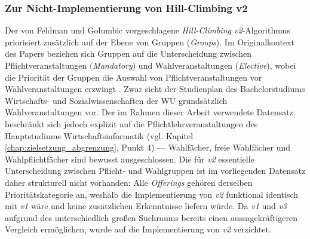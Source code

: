 \subsubsection{Zur Nicht-Implementierung von Hill-Climbing v2}

Der von Feldman und Golumbic vorgeschlagene \textit{Hill-Climbing v2}-Algorithmus priorisiert zusätzlich auf der Ebene von Gruppen (\textit{Groups}). Im Originalkontext des Papers beziehen sich Gruppen auf die Unterscheidung zwischen Pflichtveranstaltungen (\textit{Mandatory}) und Wahlveranstaltungen (\textit{Elective}), wobei die Priorität der Gruppen die Auswahl von Pflichtveranstaltungen vor Wahlveranstaltungen erzwingt \cite{feldmangolumbic}.
Zwar sieht der Studienplan des Bachelorstudiums Wirtschafts- und Sozialwissenschaften der WU grundsätzlich Wahlveranstaltungen vor. Der im Rahmen dieser Arbeit verwendete Datensatz beschränkt sich jedoch explizit auf die Pflichtlehrveranstaltungen des Hauptstudiums Wirtschaftsinformatik (vgl. Kapitel \ref{chap:zielsetzung_abgrenzung}, Punkt 4) --- Wahlfächer, freie Wahlfächer und Wahlpflichtfächer sind bewusst ausgeschlossen. Die für \textit{v2} essentielle Unterscheidung zwischen Pflicht- und Wahlgruppen ist im vorliegenden Datensatz daher strukturell nicht vorhanden: Alle \textit{Offerings} gehören derselben Prioritätskategorie an, weshalb die Implementierung von \textit{v2} funktional identisch mit \textit{v1} wäre und keine zusätzlichen Erkenntnisse liefern würde. Da \textit{v1} und \textit{v3} aufgrund des unterschiedlich großen Suchraums bereits einen aussagekräftigeren Vergleich ermöglichen, wurde auf die Implementierung von \textit{v2} verzichtet.
